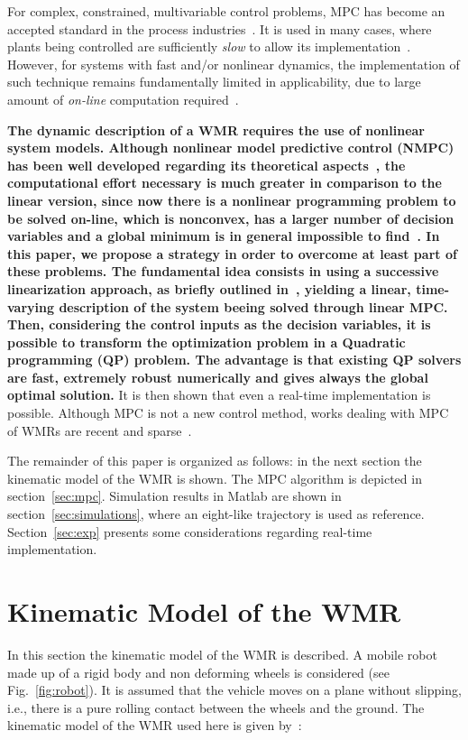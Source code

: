 \documentclass[conference]{IEEEtran} %
\begin{document}
For complex, constrained, multivariable control problems, MPC has become an
accepted standard in the process industries~\cite{bemporad02}. It is used in
many cases, where plants being controlled are sufficiently {\em slow} to
allow its implementation~\cite{mayne00}. However, for systems with fast
and/or nonlinear dynamics, the implementation of such
technique remains fundamentally limited in applicability, due to large
amount of {\em on-line} computation required~\cite{cannon00}.

{\bf The dynamic description of a WMR requires the use of nonlinear system models. Although nonlinear model predictive control (NMPC) has been well developed regarding its theoretical aspects~\cite{mayne00,chen98}, the computational effort necessary is much greater in comparison to the linear version, since now there is a nonlinear programming problem to be solved on-line, which is nonconvex, has a larger number of decision variables and a global minimum is in general impossible to find~\cite{henson98}. In this paper, we propose a strategy in order to overcome at least part of these problems. The fundamental idea consists in using a successive linearization approach, as briefly outlined in~\cite{henson98}, yielding a linear, time-varying description of the system beeing solved through linear MPC. Then, considering the control inputs as the decision variables, it is possible to transform the optimization problem in a Quadratic programming (QP) problem. The advantage is that existing QP solvers are fast, extremely robust numerically and gives always the global optimal solution.} It is then shown that even a real-time implementation is possible.
Although MPC is not a new control method, works dealing with MPC of WMRs are
recent and sparse~\cite{ollero91,rico99,essen01}.

The remainder of this paper is organized as follows: in the next section the
kinematic model of the WMR is shown. The MPC algorithm is depicted in
section~\ref{sec:mpc}. Simulation results in {\sc Matlab} are shown in
section~\ref{sec:simulations}, where an eight-like trajectory is used as
reference. Section~\ref{sec:exp} presents some considerations regarding real-time implementation.


\section{Kinematic Model of the WMR}
\label{sec:model}

In this section the kinematic model of the WMR is described. A mobile robot
made up of a rigid body and non deforming wheels is considered (see
Fig.~\ref{fig:robot}). It is assumed that the vehicle moves on a plane
without slipping, i.e., there is a pure rolling contact between the wheels
and the ground. The kinematic model of the WMR used here is given
by~\cite{Campion:TRA-12-1}:
\end{document}
